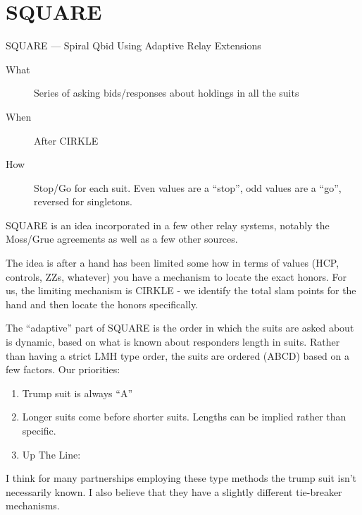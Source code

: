 \documentclass[tom-ari]{subfile}
\begin{document}
\section{SQUARE}
\label{SQUARE}

SQUARE --- Spiral Qbid Using Adaptive Relay Extensions

\normalsize


\begin{description}
	\item[What] Series of asking bids/responses about holdings in all the suits
	\item[When] After CIRKLE
	\item[How] Stop/Go for each suit.  Even values are a ``stop'', odd values are a ``go'', reversed for singletons.  
\end{description}

SQUARE is an idea incorporated in a few other relay systems, notably the Moss/Grue agreements as well as a few other sources. 

The idea is after a hand has been limited some how in terms of values (HCP, controls, ZZs, whatever) you have a mechanism to locate the exact honors.  For us, the limiting mechanism is CIRKLE - we identify the total slam points for the hand and then locate the honors specifically.

The ``adaptive'' part of SQUARE is the order in which the suits are asked about is dynamic, based on what is known about responders length in suits.  Rather than having a strict LMH type order, the suits are ordered (ABCD) based on a few factors. Our priorities:

\begin{enumerate}
	\item Trump suit is always ``A''
	\item Longer suits come before shorter suits. Lengths can be implied rather than specific.
	\item Up The Line: \ccc \ddd \hhh \sss
\end{enumerate}

I think for many partnerships employing these type methods the trump suit isn't necessarily known.  I also believe that they have a slightly different tie-breaker mechanisms.  
\end{document}
